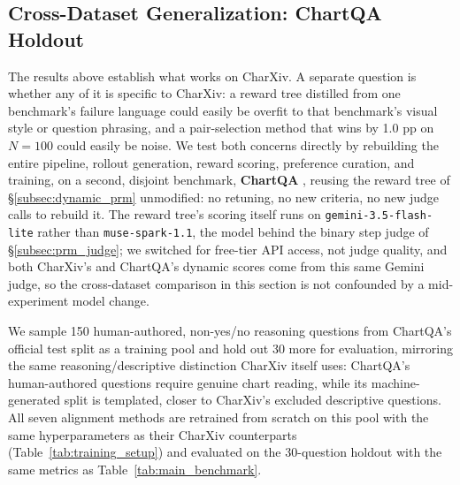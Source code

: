 \documentclass[11pt]{article}
\begin{document}
\subsection{Cross-Dataset Generalization: ChartQA Holdout}
\label{subsec:chartqa_generalization}

The results above establish what works on CharXiv. A separate question is whether any of it is specific to CharXiv: a reward tree distilled from one benchmark's failure language could easily be overfit to that benchmark's visual style or question phrasing, and a pair-selection method that wins by 1.0 pp on $N=100$ could easily be noise. We test both concerns directly by rebuilding the entire pipeline, rollout generation, reward scoring, preference curation, and training, on a second, disjoint benchmark, \textbf{ChartQA} \citep{masry2022chartqa}, reusing the reward tree of \S\ref{subsec:dynamic_prm} unmodified: no retuning, no new criteria, no new judge calls to rebuild it. The reward tree's scoring itself runs on \texttt{gemini-3.5-flash-lite} rather than \texttt{muse-spark-1.1}, the model behind the binary step judge of \S\ref{subsec:prm_judge}; we switched for free-tier API access, not judge quality, and both CharXiv's and ChartQA's dynamic scores come from this same Gemini judge, so the cross-dataset comparison in this section is not confounded by a mid-experiment model change.

We sample 150 human-authored, non-yes/no reasoning questions from ChartQA's official test split as a training pool and hold out 30 more for evaluation, mirroring the same reasoning/descriptive distinction CharXiv itself uses: ChartQA's human-authored questions require genuine chart reading, while its machine-generated split is templated, closer to CharXiv's excluded descriptive questions. All seven alignment methods are retrained from scratch on this pool with the same hyperparameters as their CharXiv counterparts (Table~\ref{tab:training_setup}) and evaluated on the 30-question holdout with the same metrics as Table~\ref{tab:main_benchmark}.
\end{document}
